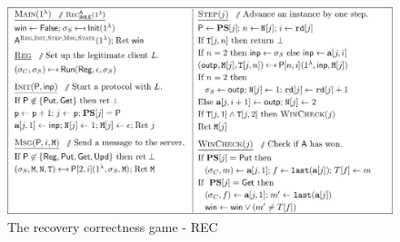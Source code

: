 \begin{figure}[H]
	\centering
	\includegraphics[width=\textwidth]{REC}
	\caption{The recovery correctness game - REC \cite{imle}}
	\label{fig:REC}
\end{figure}

